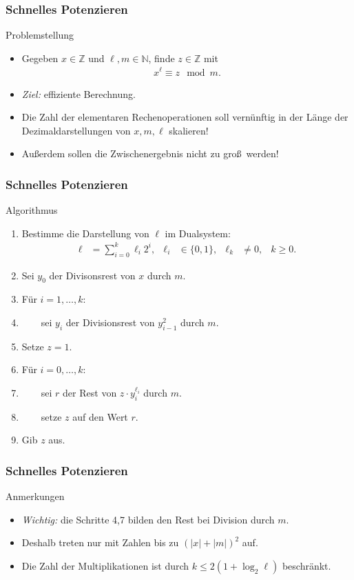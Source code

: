\documentclass{beamer}
\renewcommand{\emph}[1]{{\textcolor{solarizedRed}{\itshape #1}}}
\newcommand\NN{\mathbb N}
\newcommand\ZZ{\mathbb Z}
\renewcommand{\ae}{\"a}
\newcommand{\ue}{\"u}
\begin{document}
\begin{frame}\frametitle{Schnelles Potenzieren}
	\begin{block}{Problemstellung}
		\begin{itemize}
			\item Gegeben $x\in\ZZ$ und $\ell,m\in\NN$, finde $z\in\ZZ$ mit
				\begin{align*}
					x^\ell\equiv z\mod m.
				\end{align*}
			\item \emph{Ziel:} effiziente Berechnung.
			\item Die Zahl der elementaren Rechenoperationen soll vern\ue nftig in der L\ae nge der Dezimaldarstellungen von $x,m,\ell$ skalieren!
			\item Au\ss erdem sollen die Zwischenergebnis nicht zu gro\ss\ werden!
		\end{itemize}
	\end{block}
\end{frame}

\begin{frame}\frametitle{Schnelles Potenzieren}
	\begin{block}{Algorithmus}
		\begin{enumerate}
			\item Bestimme die Darstellung von $\ell$ im Dualsystem:
				\begin{align*}
					\ell&=\sum_{i=0}^k\ell_i2^i,&\ell_i&\in\{0,1\},&\ell_k&\neq0,&k\geq0.
				\end{align*}
			\item Sei $y_0$ der Divisonsrest von $x$ durch $m$.
			\item F\ue r $i=1,\ldots,k$:
			\item $\qquad$sei $y_i$ der Divisionsrest von $y_{i-1}^2$ durch $m$.
			\item Setze $z=1$.
			\item F\ue r $i=0,\ldots,k$:
			\item $\qquad$sei $r$ der Rest von $z\cdot y_i^{\ell_i}$ durch $m$.
			\item $\qquad$setze $z$ auf den Wert $r$.
			\item Gib $z$ aus.
		\end{enumerate}
	\end{block}
\end{frame}

\begin{frame}\frametitle{Schnelles Potenzieren}
	\begin{block}{Anmerkungen}
		\begin{itemize}
			\item \emph{Wichtig:} die Schritte 4,7 bilden den Rest bei Division durch $m$.
			\item Deshalb treten nur mit Zahlen bis zu $(|x|+|m|)^2$ auf.
			\item Die Zahl der Multiplikationen ist durch $k\leq2(1+\log_2\ell)$ beschr\ae nkt.
		\end{itemize}
	\end{block}
\end{frame}
\end{document}
